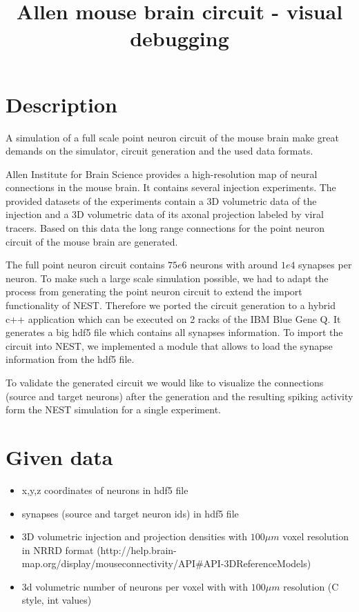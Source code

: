 \documentclass[a4paper]{IEEEtran}
\title{ Allen mouse brain circuit - visual debugging }
\begin{document}
   \maketitle
   
   \section{Description}
   A simulation of a full scale point neuron circuit of the mouse brain make great demands on the simulator, circuit generation and the used data formats.
   
Allen Institute for Brain Science provides a high-resolution map of neural connections in the mouse brain.
   It contains several injection experiments. The provided datasets of the experiments 
   contain a 3D volumetric data of the injection and a 3D volumetric data of its axonal projection labeled by viral
   tracers. Based on this data the long range connections for the point neuron circuit of the mouse brain are generated.   
   
   The full point neuron circuit contains $75e6$ neurons with around $1e4$ synapses per neuron.
   To make such a large scale simulation possible, we had to adapt the process from generating the point neuron circuit to extend the import functionality of NEST. Therefore we ported the circuit generation to a hybrid c++ application which can be executed on 2 racks of the IBM Blue Gene Q. It generates a big hdf5 file which contains all synapses information.
   To import the circuit into NEST, we implemented a module that allows to load the synapse information from the hdf5 file.
   
   To validate the generated circuit we would like to visualize the connections (source and target neurons) after the generation and the resulting spiking activity form the NEST simulation for a single experiment. 
   
   \section{Given data}
   \begin{itemize}
      \item x,y,z coordinates of neurons in hdf5 file
      \item synapses (source and target neuron ids) in hdf5 file
	  \item 3D volumetric injection and projection densities with $100\mu m$ voxel resolution in NRRD format
	  (http://help.brain-map.org/display/mouseconnectivity/API\#API-3DReferenceModels)
	  \item 3d volumetric number of neurons per voxel with with $100\mu m$ resolution (C style, int values)
   \end{itemize}
   
\end{document}
